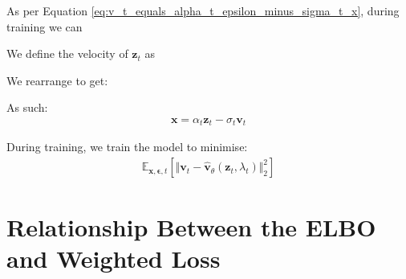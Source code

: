 \documentclass[ oneside,%
                    author={George Herbert},
                    degree={MSci},
                     title={Video Diffusion Models for Climate Simulations},
                  subtitle={}]{dissertation}
\begin{document}
As per Equation \ref{eq:v_t_equals_alpha_t_epsilon_minus_sigma_t_x}, during training we can 



We define the velocity of $\mathbf{z}_t$ as 

We rearrange to get:

As such:
\begin{align}
      \mathbf{x}=\alpha_t\mathbf{z}_t-\sigma_t\mathbf{v}_t
\end{align}

During training, we train the model to minimise:
\begin{align}
      \mathbb{E}_{\mathbf{x},\boldsymbol\epsilon, t}\left[\Vert\mathbf{v}_t-\hat{\mathbf{v}}_\theta(\mathbf{z}_t, \lambda_t)\Vert_2^2\right]
\end{align}

\section{Relationship Between the ELBO and Weighted Loss}
\label{appx:diffusion_elbo_weighted_loss}
\end{document}
